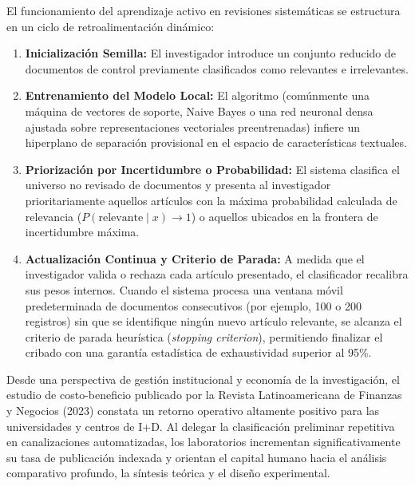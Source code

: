 El funcionamiento del aprendizaje activo en revisiones sistemáticas se estructura en un ciclo de retroalimentación dinámico:
\begin{enumerate}
    \item \textbf{Inicialización Semilla:} El investigador introduce un conjunto reducido de documentos de control previamente clasificados como relevantes e irrelevantes.
    \item \textbf{Entrenamiento del Modelo Local:} El algoritmo (comúnmente una máquina de vectores de soporte, Naive Bayes o una red neuronal densa ajustada sobre representaciones vectoriales preentrenadas) infiere un hiperplano de separación provisional en el espacio de características textuales.
    \item \textbf{Priorización por Incertidumbre o Probabilidad:} El sistema clasifica el universo no revisado de documentos y presenta al investigador prioritariamente aquellos artículos con la máxima probabilidad calculada de relevancia ($P(\text{relevante} \mid x) \to 1$) o aquellos ubicados en la frontera de incertidumbre máxima.
    \item \textbf{Actualización Continua y Criterio de Parada:} A medida que el investigador valida o rechaza cada artículo presentado, el clasificador recalibra sus pesos internos. Cuando el sistema procesa una ventana móvil predeterminada de documentos consecutivos (por ejemplo, 100 o 200 registros) sin que se identifique ningún nuevo artículo relevante, se alcanza el criterio de parada heurística (\textit{stopping criterion}), permitiendo finalizar el cribado con una garantía estadística de exhaustividad superior al 95\%.
\end{enumerate}

Desde una perspectiva de gestión institucional y economía de la investigación, el estudio de costo-beneficio publicado por la Revista Latinoamericana de Finanzas y Negocios (2023) constata un retorno operativo altamente positivo para las universidades y centros de I+D. Al delegar la clasificación preliminar repetitiva en canalizaciones automatizadas, los laboratorios incrementan significativamente su tasa de publicación indexada y orientan el capital humano hacia el análisis comparativo profundo, la síntesis teórica y el diseño experimental.

